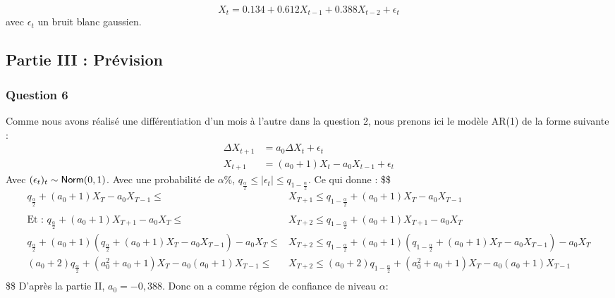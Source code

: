 \documentclass[
  landscape]{article}
\begin{document}
\[
X_t = 0.134 + 0.612X_{t-1} + 0.388X_{t-2} + \epsilon_t
\] avec \(\epsilon_t\) un bruit blanc gaussien.

\hypertarget{partie-iii-pruxe9vision}{%
\subsection{Partie III : Prévision}\label{partie-iii-pruxe9vision}}

\hypertarget{question-6}{%
\subsubsection{Question 6}\label{question-6}}

Comme nous avons réalisé une différentiation d'un mois à l'autre dans la
question 2, nous prenons ici le modèle AR(1) de la forme suivante : \[
\begin{align*}
\Delta X_{t+1} &= a_{0} \Delta X_{t} + \epsilon_{t} \\
X_{t+1} &= (a_{0}+1)X_{t} - a_{0}X_{t-1} + \epsilon_{t}
\end{align*}
\] Avec \((\epsilon_{t})_{t} \sim {\sf Norm}(0,1)\). Avec une
probabilité de \(\alpha\%\),
\(q_{\frac{\alpha}{2}} \leq \mid\epsilon_{t}\mid \leq q_{1-\frac{\alpha}{2}}\).
Ce qui donne : \$\$ \begin{align*}
q_{\frac{\alpha}{2}} + (a_{0}+1)X_{T} - a_{0}X_{T-1} \leq &X_{T+1} \leq q_{1-\frac{\alpha}{2}} + (a_{0}+1)X_{T} - a_{0}X_{T-1} \\ \\

\text{Et : } q_{\frac{\alpha}{2}} + (a_{0}+1)X_{T+1} - a_{0}X_{T} \leq &X_{T+2} \leq q_{1-\frac{\alpha}{2}} + (a_{0}+1)X_{T+1} - a_{0}X_{T} \\

q_{\frac{\alpha}{2}} + (a_{0}+1)(q_{\frac{\alpha}{2}} + (a_{0}+1)X_{T} - a_{0}X_{T-1}) - a_{0}X_{T} \leq &X_{T+2} \leq q_{1-\frac{\alpha}{2}} + (a_{0}+1)(q_{1-\frac{\alpha}{2}} + (a_{0}+1)X_{T} - a_{0}X_{T-1}) - a_{0}X_{T} \\

(a_{0}+2)q_{\frac{\alpha}{2}} + (a_{0}^2+a_{0}+1)X_{T} - a_{0}(a_{0}+1)X_{T-1} \leq &X_{T+2} \leq (a_{0}+2)q_{1-\frac{\alpha}{2}} + (a_{0}^2+a_{0}+1)X_{T} - a_{0}(a_{0}+1)X_{T-1} \\

\end{align*} \$\$ D'après la partie II, \(a_{0} = -0,388\). Donc on a
comme région de confiance de niveau \(\alpha\):
\end{document}
